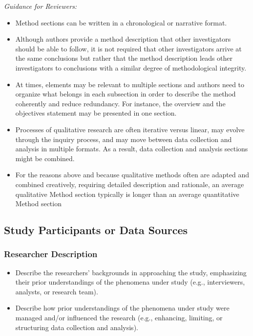 \documentclass[acmsmall,screen,anonymous,review]{acmart}
\begin{document}
\textit{Guidance for Reviewers:}

\begin{itemize}
    \item Method sections can be written in a chronological or narrative format.
    \item Although authors provide a method description that other investigators should be able to follow, it is not required that other investigators arrive at the same conclusions but rather that the method description leads other investigators to conclusions with a similar degree of methodological integrity.
\item At times, elements may be relevant to multiple sections and authors need to organize what belongs in each subsection in order to describe the method coherently and reduce redundancy. For instance, the overview and the objectives statement may be presented
in one section.
\item Processes of qualitative research are often iterative versus linear, may evolve through the
inquiry process, and may move between data collection and analysis in multiple formats. As a result, data collection and analysis sections might be combined.
\item For the reasons above and because qualitative methods often are adapted and
combined creatively, requiring detailed description and rationale, an average qualitative
Method section typically is longer than an average quantitative Method section
\end{itemize}

\subsection{Study Participants or Data Sources}

\subsubsection{Researcher Description}

\begin{itemize}
    \item Describe the researchers’ backgrounds in approaching the study, emphasizing their
prior understandings of the phenomena under study (e.g., interviewers, analysts,
or research team).
\item Describe how prior understandings of the phenomena under study were managed
and/or influenced the research (e.g., enhancing, limiting, or structuring data collection
and analysis).
\end{itemize}
\end{document}

